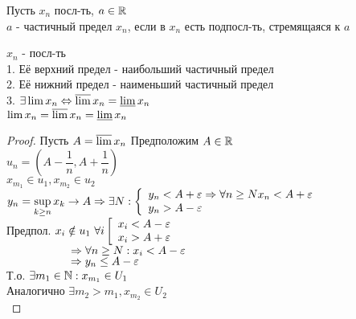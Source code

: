 \begin{definition}
	Пусть $ x_n $ посл-ть, $ a \in \mathbb{R} $ \\
	$ a $ - частичный предел $ x_n $, если в $ x_n $ есть подпосл-ть, стремящаяся к $ a $ \\
	\begin{theorem}
		$ x_n $ - посл-ть \\
		1. Её верхний предел - наибольший частичный предел \\
		2. Её нижний предел - наименьший частичный предел \\
		3. $ \exists \lim x_n \Leftrightarrow \varlimsup x_n = \varliminf x_n $ \\
		$  \lim x_n =  \varlimsup x_n = \varliminf x_n $ 
		\begin{proof}
			Пусть $ A = \varlimsup x_n $ Предположим $ A \in \mathbb{R} $\\
			$ u_n = \left( A - \dfrac{1}{n}, A + \dfrac{1}{n} \right) $ \\
			$ x_{m_1} \in u_1, x_{m_2} \in u_2 $ \\
			$ y_n = \sup\limits_{k \geq n} x_k \rightarrow A \Rightarrow \exists N : \left\{ \begin{array}{ll} y_n < A + \varepsilon \Rightarrow \forall n \geq N x_n < A + \varepsilon \\ y_n > A - \varepsilon \end{array} \right. $ \\
			Предпол. $ x_i \notin u_1 \ \forall i \left[ \begin{array}{ll} x_i < A - \varepsilon \\ x_i > A + \varepsilon \end{array} \right.$\\ %
			$\hspace*{2cm} \Rightarrow \forall n \geq N : x_i < A-\varepsilon  $ \\
			$ \hspace*{2cm} \Rightarrow y_n \leq A - \varepsilon $\\ 
			Т.о. $ \exists m_1 \in \mathbb{N} : x_{m_1} \in U_1 $\\
			Аналогично $ \exists m_2 > m_1, x_{m_2} \in U_2 $\\
			

\end{proof}
\end{theorem}
\end{definition}
